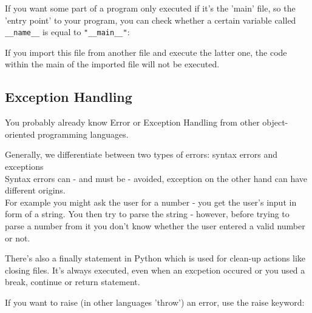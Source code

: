         If you want some part of a program only executed if it's the 'main' file, so the
        'entry point' to your program, you can check whether a certain variable called
        \texttt{__name__} is equal to \texttt{"__main__"}:


        If you import this file from another file and execute the latter one, the code within the
        main of the imported file will not be executed.


    \subsection{Exception Handling}
        You probably already know Error or Exception Handling from other object-oriented
        programming languages.

        Generally, we differentiate between two types of errors: syntax errors and exceptions \\
        Syntax errors can - and must be - avoided, exception on the other hand can have different
        origins. \\
        For example you might ask the user for a number - you get the user's input in form
        of a string. You then try to parse the string - however, before trying to parse a number
        from it you don't know whether the user entered a valid number or not.

        There's also a finally statement in Python which is used for clean-up actions like
        closing files. It's always executed, even when an excpetion occured or you used a break,
        continue or return statement.


        If you want to raise (in other languages 'throw') an error, use the raise keyword:
